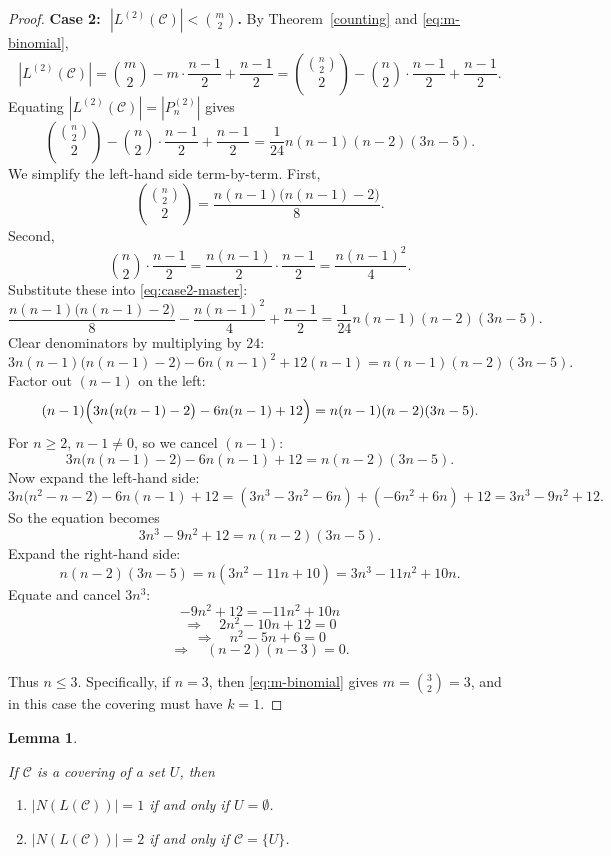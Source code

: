 \documentclass{article}
\newtheorem{lemma}[theorem]{Lemma}
\begin{document}
\begin{proof}
\medskip
\noindent\textbf{Case 2: \(\;|L^{(2)}(\mathcal C)|<\binom{m}{2}\).}
By Theorem~\ref{counting} and \eqref{eq:m-binomial},
\[
|L^{(2)}(\mathcal C)|
=\binom{m}{2}-m\cdot\frac{n-1}{2}+\frac{n-1}{2}
=\binom{\binom{n}{2}}{2}-\binom{n}{2}\cdot\frac{n-1}{2}+\frac{n-1}{2}.
\]
Equating \( |L^{(2)}(\mathcal C)|=|P_n^{(2)}| \) gives
\begin{equation}\label{eq:case2-master}
\binom{\binom{n}{2}}{2}-\binom{n}{2}\cdot\frac{n-1}{2}+\frac{n-1}{2}
=\frac{1}{24}n(n-1)(n-2)(3n-5).
\end{equation}
We simplify the left-hand side term-by-term.
First,
\[
\binom{\binom{n}{2}}{2}=\frac{n(n-1)\bigl(n(n-1)-2\bigr)}{8}.
\]
Second,
\[
\binom{n}{2}\cdot\frac{n-1}{2}
=\frac{n(n-1)}{2}\cdot\frac{n-1}{2}
=\frac{n(n-1)^2}{4}.
\]
Substitute these into \eqref{eq:case2-master}:
\[
\frac{n(n-1)\bigl(n(n-1)-2\bigr)}{8}-\frac{n(n-1)^2}{4}+\frac{n-1}{2}
=\frac{1}{24}n(n-1)(n-2)(3n-5).
\]
Clear denominators by multiplying by \(24\):
\[
3n(n-1)\bigl(n(n-1)-2\bigr)-6n(n-1)^2+12(n-1)
= n(n-1)(n-2)(3n-5).
\]
Factor out \((n-1)\) on the left:
\[
(n-1)\Bigl(3n\bigl(n(n-1)-2\bigr)-6n(n-1)+12\Bigr)
= n(n-1)(n-2)(3n-5).
\]
For \(n\ge 2\), \(n-1\neq 0\), so we cancel \((n-1)\):
\[
3n\bigl(n(n-1)-2\bigr)-6n(n-1)+12
= n(n-2)(3n-5).
\]
Now expand the left-hand side:
\[
3n\bigl(n^2-n-2\bigr)-6n(n-1)+12
= (3n^3-3n^2-6n) + (-6n^2+6n) + 12
= 3n^3-9n^2+12.
\]
So the equation becomes
\[
3n^3-9n^2+12 = n(n-2)(3n-5).
\]
Expand the right-hand side:
\[
n(n-2)(3n-5)=n(3n^2-11n+10)=3n^3-11n^2+10n.
\]
Equate and cancel \(3n^3\):
\[
-9n^2+12 = -11n^2+10n
\]
\[
\Longrightarrow\quad 2n^2-10n+12=0
\]
\[
\Longrightarrow\quad n^2-5n+6=0
\]
\[
\Longrightarrow\quad (n-2)(n-3)=0.
\]

Thus \(n\leq 3\). Specifically, if $n=3$, then \eqref{eq:m-binomial} gives \(m=\binom{3}{2}=3\), and in this case the covering must have \(k=1\).
\end{proof}

\begin{lemma}\label{heights0,1}

If $\mathcal{C}$ is a covering of a set $U$, then
\begin{enumerate}
    \item $|N(L(\mathcal{C}))|=1$ if and only if $U = \emptyset$.
    \item $|N(L(\mathcal{C}))|=2$ if and only if $\mathcal{C}=\{U\}$.
\end{enumerate}
    
\end{lemma}
\end{document}
